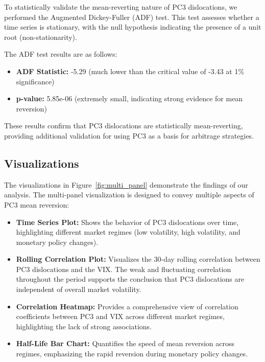 \documentclass[12pt]{article}
\begin{document}
To statistically validate the mean-reverting nature of PC3 dislocations, we performed the Augmented Dickey-Fuller (ADF) test. This test assesses whether a time series is stationary, with the null hypothesis indicating the presence of a unit root (non-stationarity).

The ADF test results are as follows:

\begin{itemize}
    \item \textbf{ADF Statistic:} -5.29 (much lower than the critical value of -3.43 at 1\% significance)
    \item \textbf{p-value:} 5.85e-06 (extremely small, indicating strong evidence for mean reversion)
\end{itemize}

These results confirm that PC3 dislocations are statistically mean-reverting, providing additional validation for using PC3 as a basis for arbitrage strategies.

\subsection{Visualizations}

The visualizations in Figure~\ref{fig:multi_panel} demonstrate the findings of our analysis. The multi-panel visualization is designed to convey multiple aspects of PC3 mean reversion:

\begin{itemize}
    \item \textbf{Time Series Plot:} Shows the behavior of PC3 dislocations over time, highlighting different market regimes (low volatility, high volatility, and monetary policy changes).
    \item \textbf{Rolling Correlation Plot:} Visualizes the 30-day rolling correlation between PC3 dislocations and the VIX. The weak and fluctuating correlation throughout the period supports the conclusion that PC3 dislocations are independent of overall market volatility.
    \item \textbf{Correlation Heatmap:} Provides a comprehensive view of correlation coefficients between PC3 and VIX across different market regimes, highlighting the lack of strong associations.
    \item \textbf{Half-Life Bar Chart:} Quantifies the speed of mean reversion across regimes, emphasizing the rapid reversion during monetary policy changes.
\end{itemize}
\end{document}
